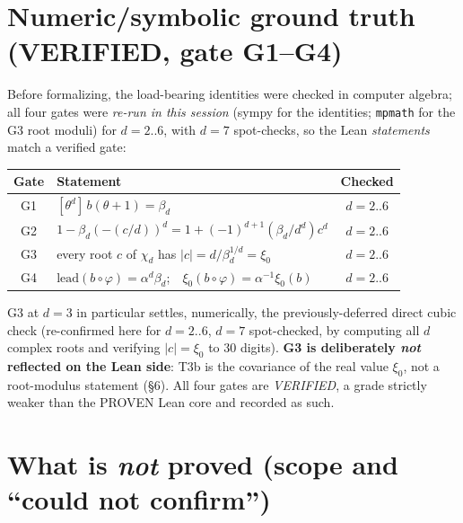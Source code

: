 \documentclass[11pt]{article}
\newcommand{\xizero}{\xi_{0}}
\begin{document}
\section{Numeric/symbolic ground truth (VERIFIED, gate G1--G4)}

Before formalizing, the load-bearing identities were checked in computer
algebra; all four gates were \emph{re-run in this session} (sympy for the
identities; \texttt{mpmath} for the G3 root moduli) for $d=2..6$, with $d=7$
spot-checks, so the Lean \emph{statements} match a verified gate:
\begin{center}
\renewcommand{\arraystretch}{1.2}
\begin{tabular}{@{}clc@{}}
\toprule
\textbf{Gate} & \textbf{Statement} & \textbf{Checked}\\
\midrule
G1 & $[\theta^{d}]\,b(\theta+1)=\beta_d$ & $d=2..6$\\
G2 & $1-\beta_d(-(c/d))^{d}=1+(-1)^{d+1}(\beta_d/d^{d})c^{d}$ & $d=2..6$\\
G3 & every root $c$ of $\chi_d$ has $|c|=d/\beta_d^{1/d}=\xizero$ & $d=2..6$\\
G4 & $\mathrm{lead}(b\circ\varphi)=\alpha^{d}\beta_d$;\ \ $\xizero(b\circ\varphi)=\alpha^{-1}\xizero(b)$ & $d=2..6$\\
\bottomrule
\end{tabular}
\end{center}
G3 at $d=3$ in particular settles, numerically, the previously-deferred direct
cubic check (re-confirmed here for $d=2..6$, $d=7$ spot-checked, by computing
all $d$ complex roots and verifying $|c|=\xizero$ to $30$ digits). \textbf{G3 is
deliberately \emph{not} reflected on the Lean side}: T3b is the covariance of the
real value $\xizero$, not a root-modulus statement (\S6). All four gates are
\emph{VERIFIED}, a grade strictly weaker than the PROVEN Lean core and recorded
as such.

\section{What is \emph{not} proved (scope and ``could not confirm'')}
\end{document}

